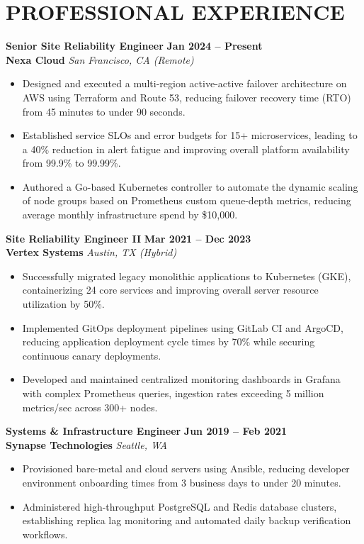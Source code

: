 \documentclass[10pt,a4paper]{article}
\newcommand{\experienceHeader}[4]{
  \noindent
  {\textbf{#1}} \hfill {\small\textbf{#4}} \\
  {\color{accent}\textbf{#2}} \hfill {\small\textit{#3}}
  \par\vspace{2pt}
}
\begin{document}
\section*{PROFESSIONAL EXPERIENCE}

\experienceHeader{Senior Site Reliability Engineer}{Nexa Cloud}{San Francisco, CA (Remote)}{Jan 2024 -- Present}
\begin{itemize}
  \item Designed and executed a multi-region active-active failover architecture on AWS using Terraform and Route 53, reducing failover recovery time (RTO) from 45 minutes to under 90 seconds.
  \item Established service SLOs and error budgets for 15+ microservices, leading to a 40\% reduction in alert fatigue and improving overall platform availability from 99.9\% to 99.99\%.
  \item Authored a Go-based Kubernetes controller to automate the dynamic scaling of node groups based on Prometheus custom queue-depth metrics, reducing average monthly infrastructure spend by \$10,000.
\end{itemize}
\vspace{4pt}

\experienceHeader{Site Reliability Engineer II}{Vertex Systems}{Austin, TX (Hybrid)}{Mar 2021 -- Dec 2023}
\begin{itemize}
  \item Successfully migrated legacy monolithic applications to Kubernetes (GKE), containerizing 24 core services and improving overall server resource utilization by 50\%.
  \item Implemented GitOps deployment pipelines using GitLab CI and ArgoCD, reducing application deployment cycle times by 70\% while securing continuous canary deployments.
  \item Developed and maintained centralized monitoring dashboards in Grafana with complex Prometheus queries, ingestion rates exceeding 5 million metrics/sec across 300+ nodes.
\end{itemize}
\vspace{4pt}

\experienceHeader{Systems \& Infrastructure Engineer}{Synapse Technologies}{Seattle, WA}{Jun 2019 -- Feb 2021}
\begin{itemize}
  \item Provisioned bare-metal and cloud servers using Ansible, reducing developer environment onboarding times from 3 business days to under 20 minutes.
  \item Administered high-throughput PostgreSQL and Redis database clusters, establishing replica lag monitoring and automated daily backup verification workflows.
\end{itemize}
\end{document}
